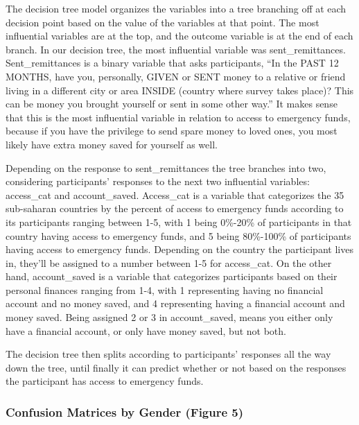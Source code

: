 \documentclass[water,article,submit,moreauthors,pdftex]{mdpi}
\begin{document}
The decision tree model organizes the variables into a tree branching
off at each decision point based on the value of the variables at that
point. The most influential variables are at the top, and the outcome
variable is at the end of each branch. In our decision tree, the most
influential variable was sent\_remittances. Sent\_remittances is a
binary variable that asks participants, ``In the PAST 12 MONTHS, have
you, personally, GIVEN or SENT money to a relative or friend living in a
different city or area INSIDE (country where survey takes place)? This
can be money you brought yourself or sent in some other way.'' It makes
sense that this is the most influential variable in relation to access
to emergency funds, because if you have the privilege to send spare
money to loved ones, you most likely have extra money saved for yourself
as well.

Depending on the response to sent\_remittances the tree branches into
two, considering participants' responses to the next two influential
variables: access\_cat and account\_saved. Access\_cat is a variable
that categorizes the 35 sub-saharan countries by the percent of access
to emergency funds according to its participants ranging between 1-5,
with 1 being 0\%-20\% of participants in that country having access to
emergency funds, and 5 being 80\%-100\% of participants having access to
emergency funds. Depending on the country the participant lives in,
they'll be assigned to a number between 1-5 for access\_cat. On the
other hand, account\_saved is a variable that categorizes participants
based on their personal finances ranging from 1-4, with 1 representing
having no financial account and no money saved, and 4 representing
having a financial account and money saved. Being assigned 2 or 3 in
account\_saved, means you either only have a financial account, or only
have money saved, but not both.

The decision tree then splits according to participants' responses all
the way down the tree, until finally it can predict whether or not based
on the responses the participant has access to emergency funds.

\hypertarget{confusion-matrices-by-gender-figure-5}{%
\subsubsection{Confusion Matrices by Gender (Figure
5)}\label{confusion-matrices-by-gender-figure-5}}
\end{document}
